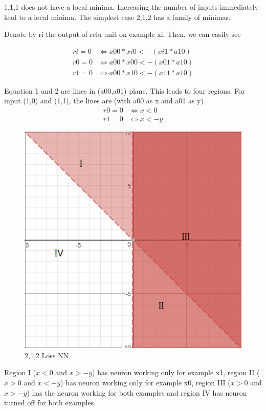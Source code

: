 \documentclass[conference]{IEEEtran}
\begin{document}
1,1,1 does not have a local minima. Increasing the number of inputs immediately lead to a local minima. The simplest case 2,1,2 has a family of minimas.

Denote by ri the output of relu unit on example xi. Then, we can easily see

\begin{align}
ri = 0 &\iff a00*xi0 < -(xi1*a10) \\
r0 = 0 &\iff a00*x00 < -(x01*a10) \\
r1 = 0 &\iff a00*x10 < -(x11*a10)
\end{align}

Equation 1 and 2 are lines in (a00,a01) plane. This leads to four regions. For input (1,0) and (1,1), the lines are (with a00 as x and a01 as y)
\begin{align}
r0 = 0 &\iff x < 0 \\
r1 = 0 &\iff x < -y
\end{align}

\begin{figure}
	\includegraphics[width=\linewidth]{images/nn/212loss.png}
	\caption{2,1,2 Loss NN}
	\label{fig:212loss}
\end{figure}

Region I ($x<0$ and $x>-y$) has neuron working only for example x1, region II ($x>0$ and $x<-y$) has neuron working only for example x0, region III ($x>0$ and $x>-y$) has the neuron working for both examples and region IV has neuron turned off for both examples.
\end{document}
